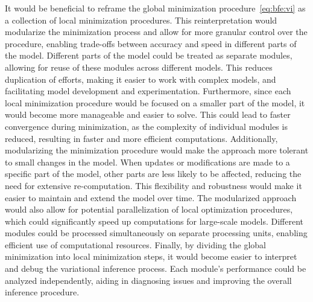 It would be beneficial to reframe the global minimization procedure~\eqref{eq:bfe:vi} as a
collection of local minimization procedures.
This reinterpretation would modularize the minimization process and allow for more granular
control over the procedure, enabling trade-offs between accuracy and speed in different parts
of the model.
Different parts of the model could be treated as separate modules, allowing for reuse of these
modules across different models.
This reduces duplication of efforts, making it easier to work with complex models, and
facilitating model development and experimentation.
Furthermore, since each local minimization procedure would be focused on a smaller part of the
model, it would become more manageable and easier to solve.
This could lead to faster convergence during minimization, as the complexity of individual
modules is reduced, resulting in faster and more efficient computations.
Additionally, modularizing the minimization procedure would make the approach more tolerant to
small changes in the model.
When updates or modifications are made to a specific part of the model, other parts are less
likely to be affected, reducing the need for extensive re-computation.
This flexibility and robustness would make it easier to maintain and extend the model over time.
The modularized approach would also allow for potential parallelization of local optimization
procedures, which could significantly speed up computations for large-scale models.
Different modules could be processed simultaneously on separate processing units, enabling
efficient use of computational resources.
Finally, by dividing the global minimization into local minimization steps, it would become easier
to interpret and debug the variational inference process.
Each module's performance could be analyzed independently, aiding in diagnosing issues and
improving the overall inference procedure.

